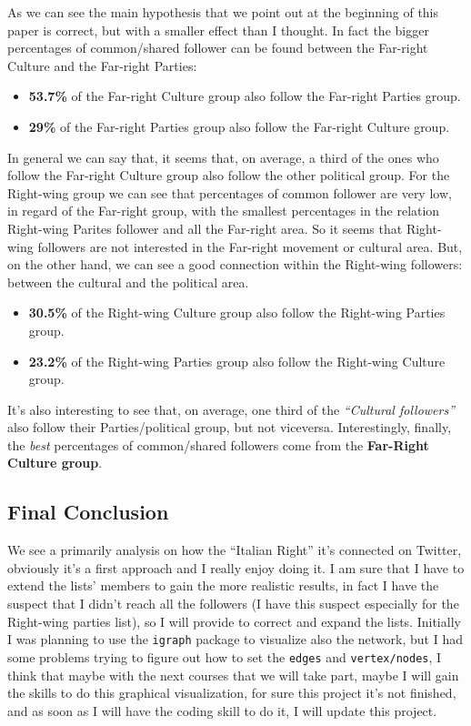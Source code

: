 \documentclass[
]{article}
\providecommand{\tightlist}{%
  \setlength{\itemsep}{0pt}\setlength{\parskip}{0pt}}
\begin{document}
As we can see the main hypothesis that we point out at the beginning of
this paper is correct, but with a smaller effect than I thought. In fact
the bigger percentages of common/shared follower can be found between
the Far-right Culture and the Far-right Parties:

\begin{itemize}
\tightlist
\item
  \textbf{53.7\%} of the Far-right Culture group also follow the
  Far-right Parties group.
\item
  \textbf{29\%} of the Far-right Parties group also follow the Far-right
  Culture group.
\end{itemize}

In general we can say that, it seems that, on average, a third of the
ones who follow the Far-right Culture group also follow the other
political group. For the Right-wing group we can see that percentages of
common follower are very low, in regard of the Far-right group, with the
smallest percentages in the relation Right-wing Parites follower and all
the Far-right area. So it seems that Right-wing followers are not
interested in the Far-right movement or cultural area. But, on the other
hand, we can see a good connection within the Right-wing followers:
between the cultural and the political area.

\begin{itemize}
\tightlist
\item
  \textbf{30.5\%} of the Right-wing Culture group also follow the
  Right-wing Parties group.
\item
  \textbf{23.2\%} of the Right-wing Parties group also follow the
  Right-wing Culture group.
\end{itemize}

It's also interesting to see that, on average, one third of the
\emph{``Cultural followers''} also follow their Parties/political group,
but not viceversa. Interestingly, finally, the \emph{best} percentages
of common/shared followers come from the \textbf{Far-Right Culture
group}.

\hypertarget{final-conclusion}{%
\subsection{Final Conclusion}\label{final-conclusion}}

We see a primarily analysis on how the ``Italian Right'' it's connected
on Twitter, obviously it's a first approach and I really enjoy doing it.
I am sure that I have to extend the lists' members to gain the more
realistic results, in fact I have the suspect that I didn't reach all
the followers (I have this suspect especially for the Right-wing parties
list), so I will provide to correct and expand the lists. Initially I
was planning to use the \texttt{igraph} package to visualize also the
network, but I had some problems trying to figure out how to set the
\texttt{edges} and \texttt{vertex/nodes}, I think that maybe with the
next courses that we will take part, maybe I will gain the skills to do
this graphical visualization, for sure this project it's not finished,
and as soon as I will have the coding skill to do it, I will update this
project.
\end{document}

